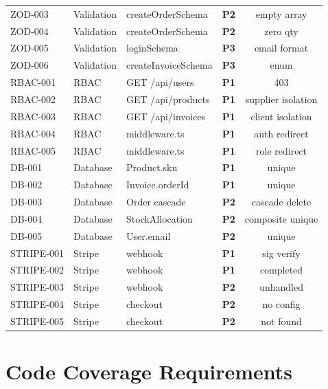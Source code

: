 \documentclass[12pt,a4paper]{report}
\newcommand{\pone}{\textbf{\color{p1red}P1}}
\newcommand{\ptwo}{\textbf{\color{p2orange}P2}}
\newcommand{\pthree}{\textbf{\color{p3blue}P3}}
\begin{document}
\begin{center}
\begin{longtable}{llllc}
  ZOD-003  & Validation & createOrderSchema & \ptwo & empty array \\
  ZOD-004  & Validation & createOrderSchema & \ptwo & zero qty \\
  ZOD-005  & Validation & loginSchema & \pthree & email format \\
  ZOD-006  & Validation & createInvoiceSchema & \pthree & enum \\
  RBAC-001 & RBAC & GET /api/users & \pone & 403 \\
  RBAC-002 & RBAC & GET /api/products & \pone & supplier isolation \\
  RBAC-003 & RBAC & GET /api/invoices & \pone & client isolation \\
  RBAC-004 & RBAC & middleware.ts & \pone & auth redirect \\
  RBAC-005 & RBAC & middleware.ts & \pone & role redirect \\
  DB-001   & Database & Product.sku & \pone & unique \\
  DB-002   & Database & Invoice.orderId & \pone & unique \\
  DB-003   & Database & Order cascade & \ptwo & cascade delete \\
  DB-004   & Database & StockAllocation & \ptwo & composite unique \\
  DB-005   & Database & User.email & \ptwo & unique \\
  STRIPE-001 & Stripe & webhook & \pone & sig verify \\
  STRIPE-002 & Stripe & webhook & \pone & completed \\
  STRIPE-003 & Stripe & webhook & \ptwo & unhandled \\
  STRIPE-004 & Stripe & checkout & \ptwo & no config \\
  STRIPE-005 & Stripe & checkout & \ptwo & not found \\
  \bottomrule
\end{longtable}
\end{center}

\section{Code Coverage Requirements}
\end{document}
